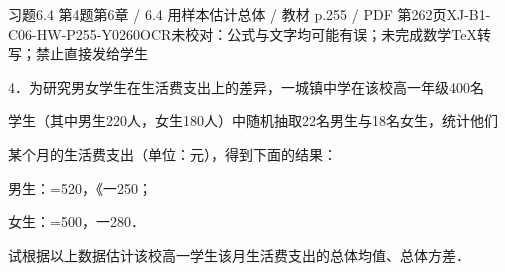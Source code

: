 \begin{bankitem}{习题6.4 第4题}{第6章 / 6.4 用样本估计总体 / 教材 p.255 / PDF 第262页}{XJ-B1-C06-HW-P255-Y0260}{OCR未校对：公式与文字均可能有误；未完成数学TeX转写；禁止直接发给学生}
\begin{ocrdraft}
\par
4．为研究男女学生在生活费支出上的差异，一城镇中学在该校高一年级400名
\par
学生（其中男生220人，女生180人）中随机抽取22名男生与18名女生，统计他们
\par
某个月的生活费支出（单位：元），得到下面的结果：
\par
男生：=520，《一250；
\par
女生：=500，一280．
\par
试根据以上数据估计该校高一学生该月生活费支出的总体均值、总体方差．
\end{ocrdraft}
\end{bankitem}
